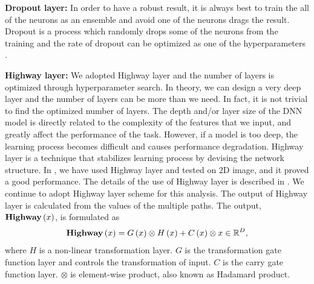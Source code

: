 \documentclass[useamsfonts]{pasj01}
\begin{document}
{\bf Dropout layer:}
In order to have a robust result, it is always best to train the all of the neurons as an ensemble and avoid one of the neurons drags the result.  Dropout is a process which randomly drops some of the neurons from the training and the rate of dropout can be optimized as one of the hyperparameters \citep{dropout}. 

{\bf Highway layer:}
We adopted Highway layer \citep{srivastava15a} and the number of layers is optimized through hyperparameter search.   In theory, we can design a very deep layer and the number of layers can be more than we need.   In fact, it is not trivial to find the optimized number of layers.   
The depth and/or layer size of the DNN model is directly related to the complexity of the features that we input, and greatly affect the performance of the task.  
However, if a model is too deep, the learning process becomes difficult and causes performance degradation.
Highway layer is a technique that stabilizes learning process by devising the network structure.
In \citet{Kimura17}, we have used Highway layer and tested on 2D image, and it proved a good performance.  The details of the use of Highway layer is described in \citet{Kimura17}.  We continue to adopt Highway layer scheme for this analysis.
The output of Highway layer is calculated from the values of the multiple paths.
The output, ${\bf Highway} \left(x\right)$, is formulated as
\begin{equation}
    {\bf Highway} \left(x\right) = G \left(x\right) \otimes H \left(x\right) + C \left(x\right) \otimes x \in \mathbb{R}^D,
\end{equation}
where $H$ is a non-linear transformation layer. $G$ is the transformation gate function layer and controls the transformation of input.  $C$ is the carry gate function layer. $\otimes$ is element-wise product, also known as Hadamard product.
\end{document}
